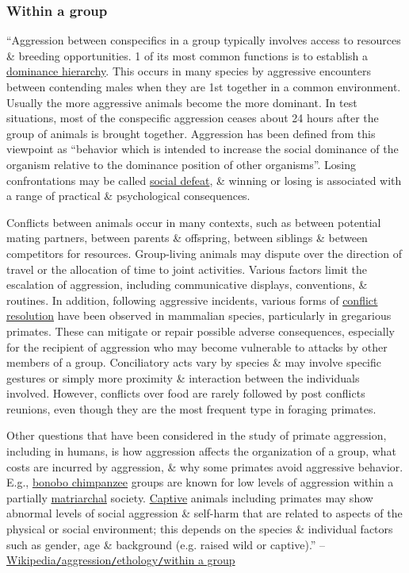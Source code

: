 \documentclass[oneside]{book}
\numberwithin{equation}{section}
\begin{document}
\subsubsection{Within a group}
``Aggression between conspecifics in a group typically involves access to resources \& breeding opportunities. 1 of its most common functions is to establish a \href{https://en.wikipedia.org/wiki/Dominance_hierarchy}{dominance hierarchy}. This occurs in many species by aggressive encounters between contending males when they are 1st together in a common environment. Usually the more aggressive animals become the more dominant. In test situations, most of the conspecific aggression ceases about 24 hours after the group of animals is brought together. Aggression has been defined from this viewpoint as ``behavior which is intended to increase the social dominance of the organism relative to the dominance position of other organisms''. Losing confrontations may be called \href{https://en.wikipedia.org/wiki/Social_defeat}{social defeat}, \& winning or losing is associated with a range of practical \& psychological consequences.

Conflicts between animals occur in many contexts, such as between potential mating partners, between parents \& offspring, between siblings \& between competitors for resources. Group-living animals may dispute over the direction of travel or the allocation of time to joint activities. Various factors limit the escalation of aggression, including communicative displays, conventions, \& routines. In addition, following aggressive incidents, various forms of \href{https://en.wikipedia.org/wiki/Conflict_resolution}{conflict resolution} have been observed in mammalian species, particularly in gregarious primates. These can mitigate or repair possible adverse consequences, especially for the recipient of aggression who may become vulnerable to attacks by other members of a group. Conciliatory acts vary by species \& may involve specific gestures or simply more proximity \& interaction between the individuals involved. However, conflicts over food are rarely followed by post conflicts reunions, even though they are the most frequent type in foraging primates.

Other questions that have been considered in the study of primate aggression, including in humans, is how aggression affects the organization of a group, what costs are incurred by aggression, \& why some primates avoid aggressive behavior. E.g., \href{https://en.wikipedia.org/wiki/Bonobo}{bonobo chimpanzee} groups are known for low levels of aggression within a partially \href{https://en.wikipedia.org/wiki/Matriarchal}{matriarchal} society. \href{https://en.wikipedia.org/wiki/Captivity_(animal)}{Captive} animals including primates may show abnormal levels of social aggression \& self-harm that are related to aspects of the physical or social environment; this depends on the species \& individual factors such as gender, age \& background (e.g. raised wild or captive).'' -- \href{https://en.wikipedia.org/wiki/Aggression#Within_a_group}{Wikipedia\texttt{/}aggression\texttt{/}ethology\texttt{/}within a group}
\end{document}
